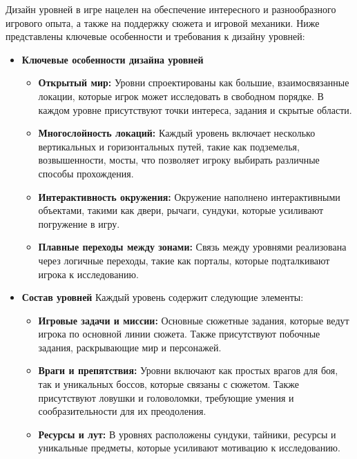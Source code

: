 \documentclass{article}
\begin{document}
Дизайн уровней в игре нацелен на обеспечение интересного и разнообразного игрового опыта, а также на поддержку сюжета и игровой механики. Ниже представлены ключевые особенности и требования к дизайну уровней:
\begin{itemize}
 \item \textbf{Ключевые особенности дизайна уровней}
\begin{itemize}
    \item \textbf{Открытый мир:} Уровни спроектированы как большие, взаимосвязанные локации, которые игрок может исследовать в свободном порядке. В каждом уровне присутствуют точки интереса, задания и скрытые области.
    \item \textbf{Многослойность локаций:} Каждый уровень включает несколько вертикальных и горизонтальных путей, такие как подземелья, возвышенности, мосты, что позволяет игроку выбирать различные способы прохождения.
    \item \textbf{Интерактивность окружения:} Окружение наполнено интерактивными объектами, такими как двери, рычаги, сундуки, которые усиливают погружение в игру.
    \item \textbf{Плавные переходы между зонами:} Связь между уровнями реализована через логичные переходы, такие как порталы, которые подталкивают игрока к исследованию.
\end{itemize}

 \item \textbf{Состав уровней}
Каждый уровень содержит следующие элементы:
\begin{itemize}
    \item \textbf{Игровые задачи и миссии:} Основные сюжетные задания, которые ведут игрока по основной линии сюжета. Также присутствуют побочные задания, раскрывающие мир и персонажей.
    \item \textbf{Враги и препятствия:} Уровни включают как простых врагов для боя, так и уникальных боссов, которые связаны с сюжетом. Также присутствуют ловушки и головоломки, требующие умения и сообразительности для их преодоления.
    \item \textbf{Ресурсы и лут:} В уровнях расположены сундуки, тайники, ресурсы и уникальные предметы, которые усиливают мотивацию к исследованию.
\end{itemize}


\end{itemize}
\end{document}
